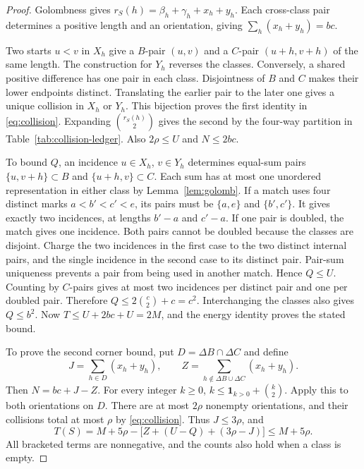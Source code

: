 \documentclass[11pt,a4paper]{article}
\theoremstyle{definition}
\newcommand{\ind}{\mathbf1}
\numberwithin{equation}{section}
\begin{document}
\begin{proof}
Golombness gives $r_S(h)=\beta_h+\gamma_h+x_h+y_h$.
Each cross-class pair determines a positive length and an orientation,
giving $\sum_h(x_h+y_h)=bc$.

Two starts $u<v$ in $X_h$ give a $B$-pair $(u,v)$ and a $C$-pair
$(u+h,v+h)$ of the same length. The construction for $Y_h$ reverses
the classes. Conversely, a shared positive difference has one pair in
each class. Disjointness of $B$ and $C$ makes their
lower endpoints distinct. Translating the earlier pair to the later
one gives a unique collision in $X_h$ or $Y_h$. This bijection proves the first
identity in \eqref{eq:collision}. Expanding $\binom{r_S(h)}2$ gives
the second by the four-way partition in Table~\ref{tab:collision-ledger}.
Also $2\rho\le U$ and $N\le2bc$.

To bound $Q$, an incidence $u\in X_h$, $v\in Y_h$ determines
equal-sum pairs $\{u,v+h\}\subset B$ and $\{u+h,v\}\subset C$.
Each sum has at most one unordered representation in either class
by Lemma~\ref{lem:golomb}. If a match uses four distinct marks
$a<b'<c'<e$, its pairs must be $\{a,e\}$ and $\{b',c'\}$.
It gives exactly two incidences, at lengths $b'-a$ and $c'-a$.
If one pair is doubled, the match gives one incidence. Both pairs
cannot be doubled because the classes are disjoint.
Charge the two incidences in the first case to the two distinct
internal pairs, and the single incidence in the second case to its
distinct pair. Pair-sum uniqueness prevents a pair from being used
in another match. Hence $Q\le U$.
Counting by $C$-pairs gives at most
two incidences per distinct pair and one per doubled pair. Therefore
$Q\le2\binom c2+c=c^2$. Interchanging the classes also gives $Q\le b^2$.
Now $T\le U+2bc+U=2M$, and the energy identity proves the stated bound.

To prove the second corner bound, put $D=\Delta B\cap\Delta C$ and define
\[
J=\sum_{h\in D}(x_h+y_h),\qquad
Z=\sum_{h\notin\Delta B\cup\Delta C}(x_h+y_h).
\]
Then $N=bc+J-Z$. For every integer $k\ge0$,
$k\le\ind_{k>0}+\binom k2$. Apply this to both orientations on $D$.
There are at most $2\rho$ nonempty orientations, and their collisions
total at most $\rho$ by \eqref{eq:collision}. Thus $J\le3\rho$, and
\begin{equation}\label{eq:shared-difference-deficit}
T(S)=M+5\rho-\bigl[Z+(U-Q)+(3\rho-J)\bigr]\le M+5\rho.
\end{equation}
All bracketed terms are nonnegative, and the counts also hold
when a class is empty.
\end{proof}
\end{document}
